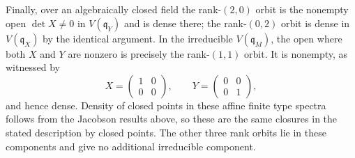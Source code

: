 \begin{example}
Finally, over an algebraically closed field the rank-$(2,0)$ orbit
is the nonempty open $\det X\ne0$ in $V(\mathfrak q_Y)$ and is
dense there; the rank-$(0,2)$ orbit is dense in $V(\mathfrak q_X)$
by the identical argument. In the irreducible $V(\mathfrak q_M)$,
the open where both $X$ and $Y$ are nonzero is precisely the
rank-$(1,1)$ orbit. It is nonempty, as witnessed by
$$
X=\begin{pmatrix}1&0\\0&0\end{pmatrix},\qquad
Y=\begin{pmatrix}0&0\\0&1\end{pmatrix},
$$
and hence dense. Density of closed points in these affine finite
type spectra follows from the Jacobson results above, so these
are the same closures in the stated description by closed points.
The other three rank orbits lie in these components and give no
additional irreducible component.
\end{example}
